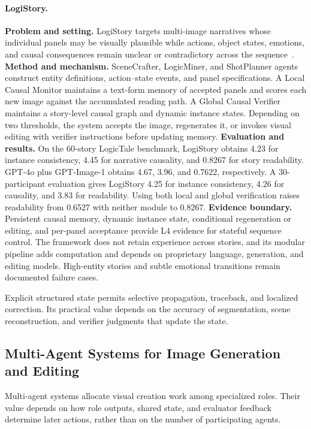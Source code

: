 \paragraph{LogiStory.}
\textbf{Problem and setting.} LogiStory targets multi-image narratives whose individual panels may be visually plausible while actions, object states, emotions, and causal consequences remain unclear or contradictory across the sequence~\cite{avg260328082}. \textbf{Method and mechanism.} SceneCrafter, LogicMiner, and ShotPlanner agents construct entity definitions, action--state events, and panel specifications. A Local Causal Monitor maintains a text-form memory of accepted panels and scores each new image against the accumulated reading path. A Global Causal Verifier maintains a story-level causal graph and dynamic instance states. Depending on two thresholds, the system accepts the image, regenerates it, or invokes visual editing with verifier instructions before updating memory. \textbf{Evaluation and results.} On the 60-story LogicTale benchmark, LogiStory obtains 4.23 for instance consistency, 4.45 for narrative causality, and 0.8267 for story readability. GPT-4o plus GPT-Image-1 obtains 4.67, 3.96, and 0.7622, respectively. A 30-participant evaluation gives LogiStory 4.25 for instance consistency, 4.26 for causality, and 3.83 for readability. Using both local and global verification raises readability from 0.6527 with neither module to 0.8267. \textbf{Evidence boundary.} Persistent causal memory, dynamic instance state, conditional regeneration or editing, and per-panel acceptance provide L4 evidence for stateful sequence control. The framework does not retain experience across stories, and its modular pipeline adds computation and depends on proprietary language, generation, and editing models. High-entity stories and subtle emotional transitions remain documented failure cases.

Explicit structured state permits selective propagation, traceback, and localized correction. Its practical value depends on the accuracy of segmentation, scene reconstruction, and verifier judgments that update the state.

\subsection{Multi-Agent Systems for Image Generation and Editing}
Multi-agent systems allocate visual creation work among specialized roles. Their value depends on how role outputs, shared state, and evaluator feedback determine later actions, rather than on the number of participating agents.

